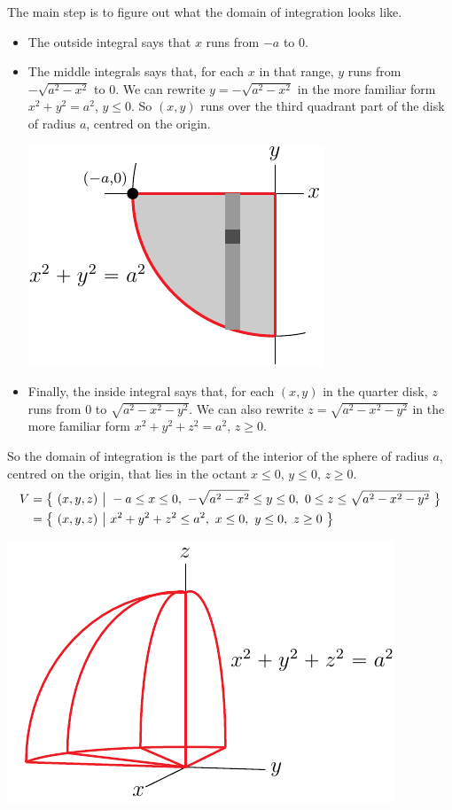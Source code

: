 \begin{solution}
The main step is to figure out what the domain of integration 
looks like. 
\begin{itemize}
\item
The outside integral says that $x$ runs from $-a$ to $0$. 
\item
The middle integrals says that, for each $x$ in that range, $y$ runs
from $-\sqrt{a^2-x^2}$ to $0$. We can rewrite $y=-\sqrt{a^2-x^2}$
in the more familiar form $x^2+y^2=a^2$, $y\le 0$. So $(x,y)$
runs over the third quadrant part of the disk of radius $a$, centred 
on the origin.

\begin{center}
\includegraphics{fig/OE14D_8AA.pdf}
\end{center}

\item
Finally, the inside integral says that, for each $(x,y)$ in the quarter disk,
$z$ runs from $0$ to $\sqrt{a^2-x^2-y^2} $. We can also rewrite
$z=\sqrt{a^2-x^2-y^2}$ in the more familiar form $x^2+y^2+z^2=a^2$, $z\ge 0$.
\end{itemize}
So the domain of integration is the part of the interior of the sphere
of radius $a$, centred on the origin, that lies in the octant
$x\le 0$, $y\le 0$, $z\ge 0$.
\begin{align*}
V&=\Set{(x,y,z)}{-a\le x\le 0,\ -\sqrt{a^2-x^2}\le y\le 0,\ 
                 0\le z\le\sqrt{a^2-x^2-y^2} } \\
&=\Set{(x,y,z)}{x^2+y^2+z^2\le a^2,\ x\le 0,\ y\le 0,\ z\ge 0 }
\end{align*}

\begin{center}
\includegraphics[scale=0.95]{fig/OE14D_8BB.pdf}
\end{center}



\end{solution}

